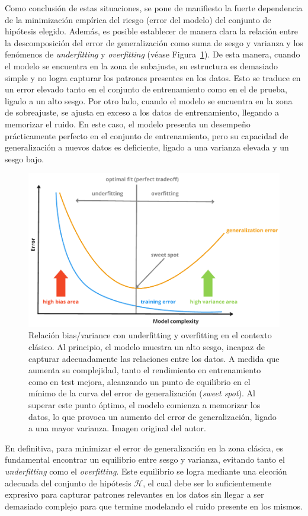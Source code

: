 Como conclusión de estas situaciones, se pone de manifiesto la fuerte dependencia de la minimización empírica del riesgo (error del modelo) del conjunto de hipótesis elegido. Además, es posible establecer de manera clara la relación entre la descomposición del error de generalización como suma de sesgo y varianza y los fenómenos de \emph{underfitting} y \emph{overfitting} (véase Figura~\ref{fig:biasvarianceunderoverfitting}). De esta manera, cuando el modelo se encuentra en la zona de subajuste, su estructura es demasiado simple y no logra capturar los patrones presentes en los datos. Esto se traduce en un error elevado tanto en el conjunto de entrenamiento como en el de prueba, ligado a un alto sesgo. Por otro lado, cuando el modelo se encuentra en la zona de sobreajuste, se ajusta en exceso a los datos de entrenamiento, llegando a memorizar el ruido. En este caso, el modelo presenta un desempeño prácticamente perfecto en el conjunto de entrenamiento, pero su capacidad de generalización a nuevos datos es deficiente, ligado a una varianza elevada y un sesgo bajo.\newline

\begin{figure}[h]
    \centering
    \includegraphics[width=0.8\linewidth]{img/biasvarianceunderoverfitting.png}
    \caption[Relación bias/variance con underfitting y overfitting en el contexto clásico.] {Relación bias/variance con underfitting y overfitting en el contexto clásico. Al principio, el modelo muestra un alto sesgo, incapaz de capturar adecuadamente las relaciones entre los datos. A medida que aumenta su complejidad, tanto el rendimiento en entrenamiento como en test mejora, alcanzando un punto de equilibrio en el mínimo de la curva del error de generalización (\textit{sweet spot}). Al superar este punto óptimo, el modelo comienza a memorizar los datos, lo que provoca un aumento del error de generalización, ligado a una mayor varianza. Imagen original del autor.}\label{fig:biasvarianceunderoverfitting}
\end{figure}

En definitiva, para minimizar el error de generalización en la zona clásica, es fundamental encontrar un equilibrio entre sesgo y varianza, evitando tanto el \emph{underfitting} como el \emph{overfitting}. Este equilibrio se logra mediante una elección adecuada del conjunto de hipótesis $\mathcal{H}$, el cual debe ser lo suficientemente expresivo para capturar patrones relevantes en los datos sin llegar a ser demasiado complejo para que termine modelando el ruido presente en los mismos.\newline


